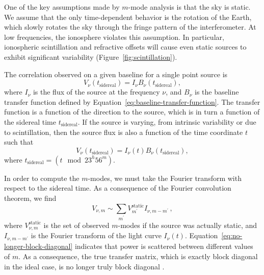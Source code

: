 \begin{bibunit}
One of the key assumptions made by $m$-mode analysis is that the sky is static.  We assume that the
only time-dependent behavior is the rotation of the Earth, which slowly rotates the sky through the
fringe pattern of the interferometer. At low frequencies, the ionosphere violates this assumption.
In particular, ionospheric scintillation and refractive offsets will cause even static sources to
exhibit significant variability (Figure~\ref{fig:scintillation}).

The correlation observed on a given baseline for a single point source is
\begin{equation}
    V_\nu(t_{\textrm{sidereal}}) = I_\nu B_\nu(t_{\textrm{sidereal}}),
\end{equation}
where $I_\nu$ is the flux of the source at the frequency $\nu$, and $B_\nu$ is the baseline transfer
function defined by Equation~\ref{eq:baseline-transfer-function}. The transfer function is a
function of the direction to the source, which is in turn a function of the sidereal time
$t_{\textrm{sidereal}}$. If the source is varying, from intrinsic variability or due to
scintillation, then the source flux is also a function of the time coordinate $t$ such that
\begin{equation}
    V_\nu(t_{\textrm{sidereal}}) = I_\nu(t) B_\nu(t_{\textrm{sidereal}}),
\end{equation}
where $t_{\textrm{sidereal}} = (t \mod 23^h56^m)$.

In order to compute the $m$-modes, we must take the Fourier transform with respect to the sidereal
time. As a consequence of the Fourier convolution theorem, we find
\begin{equation}\label{eq:no-longer-block-diagonal}
    V_{\nu, m} \sim \sum_{m^\prime} V_{m^\prime}^\textrm{static} I_{\nu, m-m^\prime}\,,
\end{equation}
where $V_{\nu, m}^{\textrm{static}}$ is the set of observed $m$-modes if the source was actually
static, and $I_{\nu, m-m^\prime}$ is the Fourier transform of the light curve $I_{\nu}(t)$.
Equation~\ref{eq:no-longer-block-diagonal} indicates that power is scattered between different
values of $m$. As a consequence, the true transfer matrix, which is exactly block diagonal in the
ideal case, is no longer truly block diagonal \citep{richard_ionosphere_thoughts}.


\end{bibunit}
